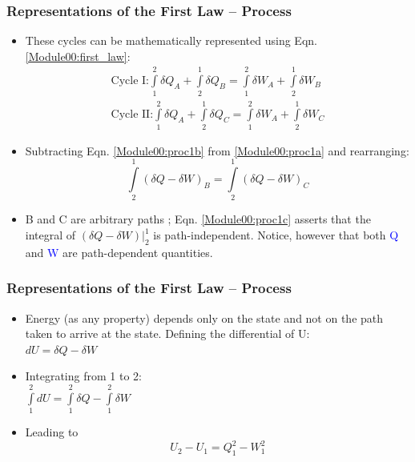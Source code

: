 \documentclass[10pt,compress]{beamer}
\begin{document}
\begin{frame}
 \frametitle{Representations of the First Law -- Process}
   \begin{itemize}
    \item <1-> These cycles can be mathematically represented using Eqn. \ref{Module00:first_law}:
   \begin{eqnarray}
    \text{Cycle I:}  \int\limits_{1}^{2}\delta Q_{A} + \int\limits_{2}^{1}\delta Q_{B} = \int\limits_{1}^{2}\delta W_{A} + \int\limits_{2}^{1}\delta W_{B}  \label{Module00:proc1a}\\
    \text{Cycle II:} \int\limits_{1}^{2}\delta Q_{A} + \int\limits_{2}^{1}\delta Q_{C} = \int\limits_{1}^{2}\delta W_{A} + \int\limits_{2}^{1}\delta W_{C}  \label{Module00:proc1b}
   \end{eqnarray}
   \item <2-> Subtracting Eqn. \ref{Module00:proc1b} from \ref{Module00:proc1a} and rearranging:
   \begin{equation}
    \int\limits_{2}^{1}\left(\delta Q- \delta W\right)_{B} = \int\limits_{2}^{1}\left(\delta Q- \delta W\right)_{C}\label{Module00:proc1c}
   \end{equation}
   \item <3-> B and C are arbitrary paths ; Eqn. \ref{Module00:proc1c} asserts that the integral of $\left(\delta Q -\delta W\right)\left.\right|_{2}^{1}$ is path-independent. Notice, however that both \textcolor{blue}{Q} and \textcolor{blue}{W} are path-dependent quantities. 
    \end{itemize}
\end{frame}



\begin{frame}
 \frametitle{Representations of the First Law -- Process}

  \begin{itemize}
   \item <1-> Energy (as any property) depends only on the state and not on the path taken to arrive at the state. Defining the differential of U:\\
    $dU =\delta Q - \delta W$\\ 
   
   \item <2-> Integrating from 1 to 2:\\
    $\displaystyle\int\limits_{1}^{2}dU =\displaystyle\int\limits_{1}^{2}\delta Q - \displaystyle\int\limits_{1}^{2}\delta W$\\ 

   \item <3-> Leading to
   \begin{equation}
    U_{2} - U_{1} = Q_{1}^{2}- W_{1}^{2} \label{Module00:proc1d}
   \end{equation}

  \end{itemize}
\normalsize
\end{frame}
\end{document}
